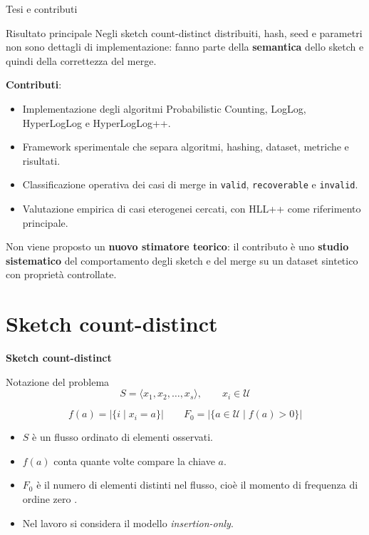 \documentclass[aspectratio=169,11pt]{beamer}
\newcommand{\Fzero}{F_0}
\begin{document}
\begin{frame}{Tesi e contributi}

\begin{block}{Risultato principale}
    \footnotesize
    Negli sketch count-distinct distribuiti, hash, seed e parametri non sono dettagli di implementazione: fanno parte della \textbf{semantica} dello sketch e quindi della correttezza del merge.
  \end{block}

  \vspace{0.15cm}

  \textbf{Contributi}: 
  \begin{itemize}
    \item Implementazione degli algoritmi Probabilistic Counting, LogLog, HyperLogLog e HyperLogLog++.
    \item Framework sperimentale che separa algoritmi, hashing, dataset, metriche e risultati.
    \item Classificazione operativa dei casi di merge in \texttt{valid}, \texttt{recoverable} e \texttt{invalid}.
    \item Valutazione empirica di casi eterogenei cercati, con HLL++ come riferimento principale.
  \end{itemize}

  Non viene proposto un \textbf{nuovo stimatore teorico}: il contributo \`e uno \textbf{studio sistematico} del comportamento degli sketch e del merge su un dataset sintetico con propriet\`a controllate.
  
\end{frame}

\section{Sketch count-distinct}

\begin{frame}[plain]
  \centering
  \vfill
  {\LARGE\bfseries Sketch count-distinct}
  \vfill
\end{frame}

\begin{frame}{Notazione del problema}
  \[
    S=\langle x_1,x_2,\dots,x_s\rangle,
    \qquad x_i\in\mathcal{U}
  \]

  \[
    f(a)=|\{i\mid x_i=a\}|
    \qquad
    \Fzero=|\{a\in\mathcal{U}\mid f(a)>0\}|
  \]

  \vspace{0.1cm}

  \begin{itemize}
    \item \(S\) \`e un flusso ordinato di elementi osservati.
    \item \(f(a)\) conta quante volte compare la chiave \(a\).
    \item \(\Fzero\) \`e il numero di elementi distinti nel flusso, cio\`e il momento di frequenza di ordine zero \cite{Alon_Matias_Szegedy_2002}.
    \item Nel lavoro si considera il modello \emph{insertion-only}.
  \end{itemize}
\end{frame}
\end{document}
